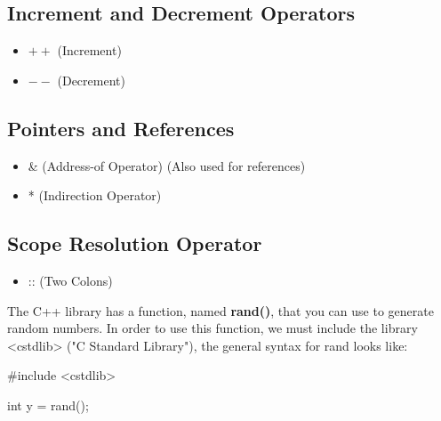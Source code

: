 \documentclass{report}
\begin{document}
    \begin{minipage}[t]{0.47\textwidth}
        \subsection{Increment and Decrement Operators}
        \begin{itemize}
          \item \( ++ \) (Increment)
          \item \( -- \) (Decrement)
        \end{itemize}
        \subsection{Pointers and References}
        \begin{itemize}
            \item \& (Address-of Operator) (Also used for references)
            \item * (Indirection Operator)
        \end{itemize}
    \end{minipage}
    \bigbreak \noindent 
    \begin{minipage}[]{0.47\textwidth}
        \subsection{Scope Resolution Operator}
        \begin{itemize}
            \item :: (Two Colons)
        \end{itemize}
    
    \end{minipage}


    \bigbreak \noindent 

    \pagebreak
    \bigbreak \noindent 
    The C++ library has a function, named \textbf{rand()}, that you can use to generate random numbers. In order to use this function, we must include the library <cstdlib> ("C Standard Library"), the general syntax for rand looks like:
    \smallbreak \noindent
    
    \begin{cppcode}
        #include <cstdlib>
        
        int y = rand();
    \end{cppcode}
    
\end{document}
